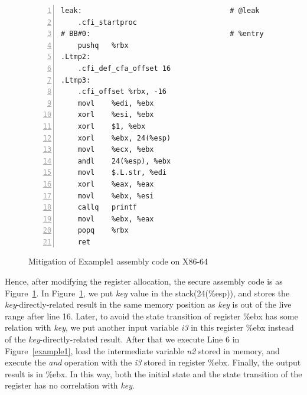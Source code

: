 \documentclass[10pt, conference]{IEEEtran}
\begin{document}
\begin{figure}[hbt!]
\centering
\begin{minipage}{.65\linewidth}
\begin{lstlisting}[language={[ANSI]C},numbers=left,numberstyle=\tiny, basicstyle=\ttfamily\small, frame=none]
leak:                                   # @leak
	.cfi_startproc
# BB#0:                                 # %entry
	pushq	%rbx
.Ltmp2:
	.cfi_def_cfa_offset 16
.Ltmp3:
	.cfi_offset %rbx, -16
	movl	%edi, %ebx
	xorl	%esi, %ebx
	xorl	$1, %ebx
	xorl	%ebx, 24(%esp)
	movl	%ecx, %ebx
	andl	24(%esp), %ebx
	movl	$.L.str, %edi
	xorl	%eax, %eax
	movl	%ebx, %esi
	callq	printf
	movl	%ebx, %eax
	popq	%rbx
	ret
\end{lstlisting}
\end{minipage}
\caption{Mitigation of Example1 assembly code on X86-64}
\label{example3}
\end{figure}
Hence, after modifying the register allocation, the secure assembly code is as Figure~\ref{example3}. In Figure~\ref{example3}, we put \emph{key} value in the stack(24(\%esp)), and stores the \emph{key}-directly-related result in the same memory position as \emph{key} is out of the live range after line 16. Later, to avoid the state transition of register \%ebx has some relation with \emph{key}, we put another input variable \emph{i3} in this register \%ebx instead of the \emph{key}-directly-related result. After that we execute Line 6 in Figure~\ref{example1}, load the intermediate variable \emph{n2} stored in memory, and execute the \emph{and} operation with the \emph{i3} stored in register \%ebx. Finally, the output result is in \%ebx. In this way, both the initial state and the state transition of the register has no correlation with \emph{key}.
\end{document}
